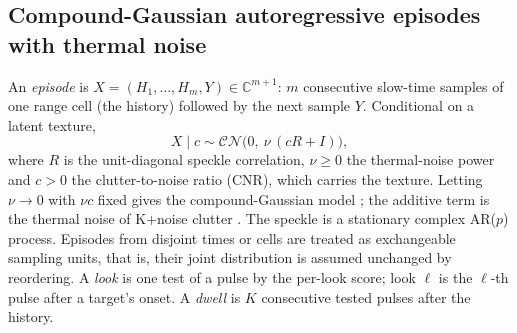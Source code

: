 \documentclass[journal]{IEEEtran}
\begin{document}
\subsection{Compound-Gaussian autoregressive episodes with thermal noise}
An \emph{episode} is $X=(H_1,\dots,H_m,Y)\in\mathbb{C}^{m+1}$: $m$ consecutive slow-time samples of one range cell (the history) followed by the next sample $Y$. Conditional on a latent texture,
\begin{equation}
X\mid c\sim\mathcal{CN}\big(0,\ \nu\,(cR+I)\big),
\label{eq:r7model}
\end{equation}
where $R$ is the unit-diagonal speckle correlation, $\nu\ge0$ the thermal-noise power and $c>0$ the clutter-to-noise ratio (CNR), which carries the texture. Letting $\nu\to0$ with $\nu c$ fixed gives the compound-Gaussian model \cite{conte1995,ollila2012}; the additive term is the thermal noise of K+noise clutter \cite{watts1987,ward2013}. The speckle is a stationary complex AR($p$) process. Episodes from disjoint times or cells are treated as exchangeable sampling units, that is, their joint distribution is assumed unchanged by reordering. A \emph{look} is one test of a pulse by the per-look score; look $\ell$ is the $\ell$-th pulse after a target's onset. A \emph{dwell} is $K$ consecutive tested pulses after the history.
\end{document}
